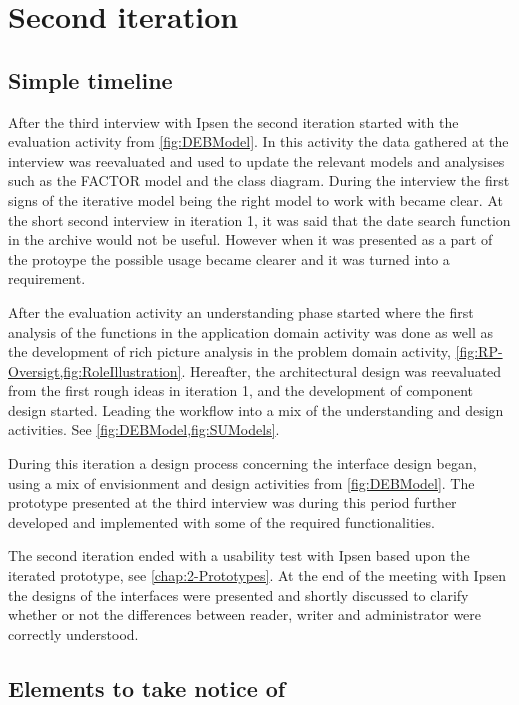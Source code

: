 \section{Second iteration}
\subsection{Simple timeline}\label{sec:2Iteration-timeline}
After the third interview with Ipsen the second iteration started with the evaluation activity from \cref{fig:DEBModel}. 
In this activity the data gathered at the interview was reevaluated and used to update the relevant models and analysises such as the FACTOR model and the class diagram.
During the interview the first signs of the iterative model being the right model to work with became clear.
At the short second interview in iteration 1, it was said that the date search function in the archive would not be useful.
However when it was presented as a part of the protoype the possible usage became clearer and it was turned into a requirement.

After the evaluation activity an understanding phase started where the first analysis of the functions in the application domain activity was done as well as the development of rich picture analysis in the problem domain activity, \cref{fig:RP-Oversigt,fig:RoleIllustration}.
Hereafter, the architectural design was reevaluated from the first rough ideas in iteration 1, and the development of component design started.
Leading the workflow into a mix of the understanding and design activities. 
See \cref{fig:DEBModel,fig:SUModels}.

During this iteration a design process concerning the interface design began, using a mix of envisionment and design activities from \cref{fig:DEBModel}.
The prototype presented at the third interview was during this period further developed and implemented with some of the required functionalities.

The second iteration ended with a usability test with Ipsen based upon the iterated prototype, see \cref{chap:2-Prototypes}. 
At the end of the meeting with Ipsen the designs of the interfaces were presented and shortly discussed to clarify whether or not the differences between reader, writer and administrator were correctly understood.

\subsection{Elements to take notice of}
